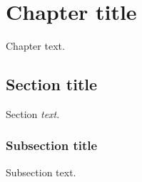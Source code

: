 

\chapter{Chapter title}

Chapter text.

\section{Section title}

Section \emph{text}. \cite{bibliography}

\subsection{Subsection title}

Subsection text.